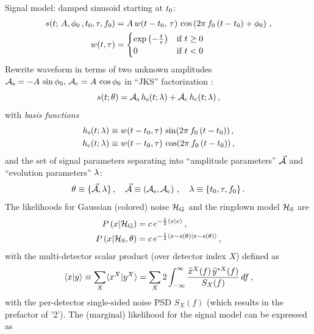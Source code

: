 \documentclass[aps,prd,onecolumn,notitlepage,nofootinbib,superscriptaddress,altaffilletter,floatfix]{revtex4-1}
\begin{document}
Signal model: damped sinusoid starting at $t_0$:
\begin{align}
  \label{eq:1}
  s(t;\,A, \phi_0\,, t_0, \tau, f_0) &= A\,w(t-t_0,\,\tau)\,\cos\left(2\pi\,f_0\,(t-t_0) + \phi_0\right)\,,\\
  w(t, \tau) &=
  \begin{cases}
    \exp\left( -\frac{t}{\tau} \right) & \text{if } t \ge 0\,\\
    0  & \text{if } t < 0
  \end{cases}
\end{align}
Rewrite waveform in terms of two unknown amplitudes $\mathcal{A}_{\mathrm{s}} = -A\,\sin\phi_0,\,\mathcal{A}_{\mathrm{c}} = A\,\cos\phi_0$ in ``JKS'' factorization
\cite{bretthorst1988:_bayesian_spectrum,jks98:_data}:
\begin{equation}
  \label{eq:2}
  s(t; \theta) = \mathcal{A}_{\mathrm{s}} \, h_\mathrm{s}(t;\lambda) + \mathcal{A}_{\mathrm{c}}\,h_\mathrm{c}(t;\lambda)\,,
\end{equation}
with \emph{basis functions}
\begin{align}
  \label{eq:14}
  h_\mathrm{s}(t;\lambda) &\equiv w(t-t_0,\tau)\,\sin(2\pi \,f_0\,(t-t_0))\,,\\
  h_\mathrm{c}(t;\lambda) &\equiv w(t-t_0,\tau)\,\cos(2\pi \,f_0\,(t-t_0))\,,
\end{align}
and the set of signal parameters separating into ``amplitude parameters'' $\vec{\mathcal{A}}$ and ``evolution parameters'' $\lambda$:
\begin{equation}
  \label{eq:11}
  \theta \equiv \{\vec{\mathcal{A}}, \lambda\}\,,
  \quad \vec{\mathcal{A}} \equiv \left(\mathcal{A}_{\mathrm{s}},\mathcal{A}_{\mathrm{c}}\right)\,,
  \quad \lambda \equiv \{t_0,\tau, f_0\}\,.
\end{equation}
The likelihoods for Gaussian (colored) noise $\mathcal{H}_{\mathrm{G}}$ and the ringdown model $\mathcal{H}_{\mathrm{S}}$ are
\begin{align}
  \label{eq:4}
  P\left(x|\mathcal{H}_{\mathrm{G}}\right) &= c\,e^{-\frac{1}{2}\langle x|x\rangle}\,,\\
  P\left(x|\mathcal{H}_{\mathrm{S}},\theta\right) &= c\,e^{-\frac{1}{2}\langle x-s(\theta)|x-s(\theta)\rangle}\,,
\end{align}
with the multi-detector scalar product (over detector index $X$) defined as
\begin{equation}
  \label{eq:5}
  \langle x|y\rangle\equiv \sum_{X} \langle x^X|y^X\rangle = \sum_X 2\int_{-\infty}^{\infty} \frac{\widetilde{x}^X(f)\,\widetilde{y}^{*X}(f)}{S_X(f)}\,df\,,
\end{equation}
with the per-detector single-sided noise PSD $S_X(f)$ (which results in the prefactor of '2').
The (marginal) likelihood for the signal model can be expressed as
\end{document}
